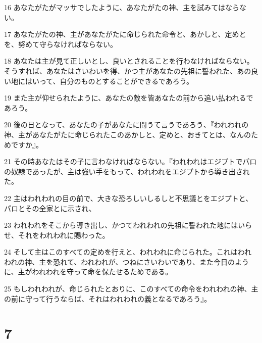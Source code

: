 \par 16 あなたがたがマッサでしたように、あなたがたの神、主を試みてはならない。
\par 17 あなたがたの神、主があなたがたに命じられた命令と、あかしと、定めとを、努めて守らなければならない。
\par 18 あなたは主が見て正しいとし、良いとされることを行わなければならない。そうすれば、あなたはさいわいを得、かつ主があなたの先祖に誓われた、あの良い地にはいって、自分のものとすることができるであろう。
\par 19 また主が仰せられたように、あなたの敵を皆あなたの前から追い払われるであろう。
\par 20 後の日となって、あなたの子があなたに問うて言うであろう、『われわれの神、主があなたがたに命じられたこのあかしと、定めと、おきてとは、なんのためですか』。
\par 21 その時あなたはその子に言わなければならない。『われわれはエジプトでパロの奴隷であったが、主は強い手をもって、われわれをエジプトから導き出された。
\par 22 主はわれわれの目の前で、大きな恐ろしいしるしと不思議とをエジプトと、パロとその全家とに示され、
\par 23 われわれをそこから導き出し、かつてわれわれの先祖に誓われた地にはいらせ、それをわれわれに賜わった。
\par 24 そして主はこのすべての定めを行えと、われわれに命じられた。これはわれわれの神、主を恐れて、われわれが、つねにさいわいであり、また今日のように、主がわれわれを守って命を保たせるためである。
\par 25 もしわれわれが、命じられたとおりに、このすべての命令をわれわれの神、主の前に守って行うならば、それはわれわれの義となるであろう』。

\chapter{7}

